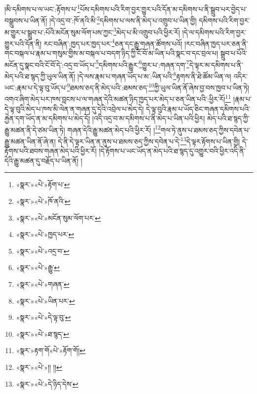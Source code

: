 །མི་དམིགས་པ་ལ་ཡང་:རྟོགས་པ་\footnote{«སྣར་»«པེ་»རྟོག་པ་}པོས་དམིགས་པའི་རིག་བྱར་གྱུར་པའི་དོན་མ་དམིགས་པ་ནི་སྒྲུབ་པར་བྱེད་པ་བསྒྲུབས་པ་ཡིན་ནོ། །དེ་འདྲ་བ་:ཁོ་ནའི་མི་\footnote{«སྣར་»«པེ་»ཁོ་ནའི་}དམིགས་པ་ལས་ནི་མེད་པ་འགྲུབ་པ་ཡིན་གྱི། དམིགས་པའི་རིག་བྱར་མ་གྱུར་པ་སྒྲུབ་པ་:པོའི་མངོན་སུམ་ལོག་པས་ཀྱང་\footnote{«སྣར་»«པེ་»མངོན་སུམ་ལོག་པར་}མེད་པ་མི་འགྲུབ་པའི་ཕྱིར་རོ། །དེ་ལ་དམིགས་པའི་རིག་བྱར་གྱུར་པའི་དོན་ནི། རང་བཞིན་:ཁྱད་པར་ཁྱད་པར་\footnote{«སྣར་»«པེ་»ཁྱད་པར་}ཅན་དང་རྒྱུ་གཞན་ཚོགས་པའོ། །རང་བཞིན་ཁྱད་པར་ཅན་ནི་གང་བསྐལ་པ་རྣམ་པ་གསུམ་གྱིས་མ་བསྐལ་པ་བདག་ཉིད་ཀྱི་ངོ་བོ་མ་ཡིན་པའི་སྣང་བ་དང་བྲལ་པ། སྒྲུབ་པ་པོའི་མངོན་དུ་སྣང་བའི་ངོ་བོ་དེ་:འདྲ་བ་ཡོད་པ་\footnote{«སྣར་»«པེ་»འདྲ་བ་}དམིགས་པའི་རྒྱུར་\footnote{«སྣར་»«པེ་»རྒྱུ་}གྱུར་པ་:གཞན་དག་\footnote{«སྣར་»«པེ་»གཞན་}དེ་ལྟར་མ་དམིགས་པ་ནི་མེད་པའི་ཐ་སྙད་ཀྱི་ཡུལ་ཡིན་ནོ། །དེ་ལས་རྣམ་པ་གཞན་ཡོད་པ་མ་:ཡིན་པའི་\footnote{«སྣར་»«པེ་»ཡིན་པར་}རྟགས་ནི་ཐེ་ཚོམ་ཡིན་ལ། འདིར་ཡང་:རྣམ་པ་དེ་ལྟ་བུ་ཡོད་པ་\footnote{«སྣར་»«པེ་»དེ་ལྟ་བུ་}ཐམས་ཅད་ནི་མེད་པའི་:ཐམས་ཅད་\footnote{«སྣར་»«པེ་»ཐ་སྙད་}ཀྱི་ཡུལ་ཡིན་ནོ་ཞེས་བྱ་བས་ཁྱབ་པ་ཡིན་ཏེ། འགའ་ཞིག་མེད་པར་ཁས་བླངས་པ་ལ་གཞན་དེའི་མཚན་ཉིད་ཁྱད་པར་མེད་པ་ཅན་ཡིན་པའི་:ཕྱིར་རོ།\footnote{«སྣར་»རྟག་གོ«པེ་»རྟོག་གོ།} །རྣམ་པ་དེ་ལྟ་བུའི་མེད་པ་ཁས་མི་ལེན་ན་གཞན་དུ་དེའི་འབྲེལ་པ་མེད་དེ། དེ་ལྟ་བུའི་རྣམ་པ་ཡོད་ཅིང་གཞན་དམིགས་པའི་རྐྱེན་དག་ཡོད་ན་མ་དམིགས་པ་མེད་དོ། །འདི་འདྲ་བ་མ་དམིགས་པ་ནི་མེད་པ་ཡིན་པའི་ཕྱིར། མེད་པའི་ཐ་སྙད་ཀྱི་རྒྱུ་མཚན་ནི་དེ་ཙམ་ཡིན་ཏེ། གཞན་དེའི་རྒྱུ་མཚན་མེད་པའི་ཕྱིར་རོ། །\footnote{«སྣར་»«པེ་»།། །།}གལ་ཏེ་ནུས་པ་ཐམས་ཅད་ཀྱིས་དབེན་པ་རྒྱུ་མཚན་ཡིན་ནོ་ཞེ་ན། དེ་ནི་དེ་ལྟར་ཡིན་ན་ནུས་པ་ཐམས་ཅད་ཀྱིས་དབེན་པ་དེ་\footnote{«སྣར་»«པེ་»དེ་ཉིད་དེས་}དེ་ལྟར་རྟོགས་པ་ཡིན་གྱི། དེ་རྟོགས་པའི་ཐབས་གཞན་མེད་པའི་ཕྱིར་རོ། །དེ་རྟོགས་པ་ཡང་ཡོད་ན་མེད་པའི་ཐ་སྙད་དུ་འགྱུར་བའི་ཕྱིར་འདི་ནི་དེའི་རྒྱུ་མཚན་དུ་བརྗོད་པ་ཡིན་ནོ། །
